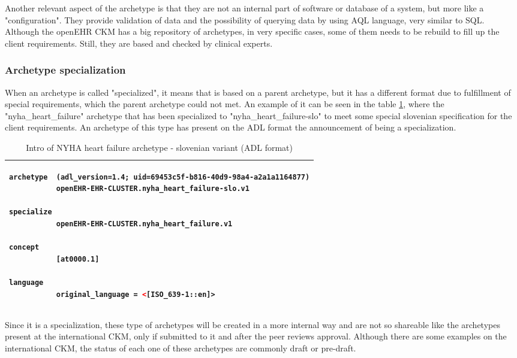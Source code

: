 \documentclass[mim_thesis.tex]{subfiles}
\begin{document}
Another relevant aspect of the archetype is that they are not an internal part of software or database of a system, but more like a "configuration". They provide validation of data and the possibility of querying data by using AQL language, very similar to SQL. Although the openEHR CKM has a big repository of archetypes, in very specific cases, some of them needs to be rebuild to fill up the client requirements. Still, they are based and checked by clinical experts.

\subsubsection{Archetype specialization}  \label{sssec:AS}
When an archetype is called "specialized", it means that is based on a parent archetype, but it has a different format due to fulfillment of special requirements, which the parent archetype could not met. An example of it can be seen in the table \ref{tab:nyha_adl}, where the "nyha\_heart\_failure" archetype that has been specialized to "nyha\_heart\_failure-slo" to meet some special slovenian specification for the client requirements. An archetype of this type has present on the ADL format the announcement of being a specialization. 

\begin{table}[H]
	\centering
\caption{Intro of NYHA heart failure archetype - slovenian variant (ADL format)}
\label{tab:nyha_adl}
\begin{tabular}{l}
\toprule[2pt]
\begin{lstlisting}[language=XML]
archetype  (adl_version=1.4; uid=69453c5f-b816-40d9-98a4-a2a1a1164877)
           openEHR-EHR-CLUSTER.nyha_heart_failure-slo.v1

specialize
           openEHR-EHR-CLUSTER.nyha_heart_failure.v1

concept
           [at0000.1]
          
language
           original_language = <[ISO_639-1::en]>
\end{lstlisting}
\tabularnewline \bottomrule[2pt]
\end{tabular}
\end{table}

Since it is a specialization, these type of archetypes will be created in a more internal way and are not so shareable like the archetypes present at the international CKM, only if submitted to it and after the peer reviews approval. Although there are some examples on the international CKM, the status of each one of these archetypes are commonly draft or pre-draft.
\end{document}
